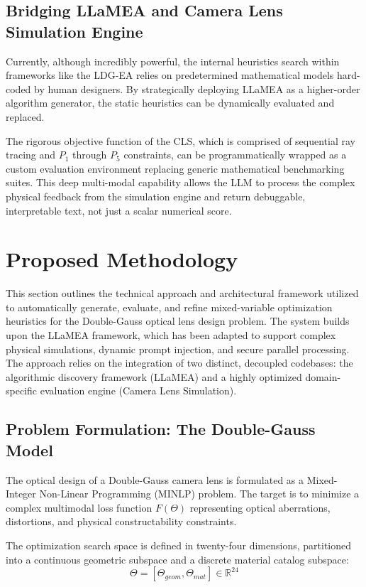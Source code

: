 \documentclass[12pt]{article}
\begin{document}
\subsection{Bridging LLaMEA and Camera Lens Simulation Engine}
Currently, although incredibly powerful, the internal heuristics search within frameworks like the LDG-EA relies on predetermined mathematical models hard-coded by human designers. By strategically deploying LLaMEA as a higher-order algorithm generator, the static heuristics can be dynamically evaluated and replaced.

The rigorous objective function of the CLS, which is comprised of sequential ray tracing and $P_1$ through $P_5$ constraints, can be programmatically wrapped as a custom evaluation environment replacing generic mathematical benchmarking suites. This deep multi-modal capability allows the LLM to process the complex physical feedback from the simulation engine and return debuggable, interpretable text, not just a scalar numerical score.


\section{Proposed Methodology}\label{sec:methodology}

This section outlines the technical approach and architectural framework utilized to automatically generate, evaluate, and refine mixed-variable optimization heuristics for the Double-Gauss optical lens design problem. The system builds upon the LLaMEA framework, which has been adapted to support complex physical simulations, dynamic prompt injection, and secure parallel processing. The approach relies on the integration of two distinct, decoupled codebases: the algorithmic discovery framework (LLaMEA) and a highly optimized domain-specific evaluation engine (Camera Lens Simulation).

\subsection{Problem Formulation: The Double-Gauss Model}
The optical design of a Double-Gauss camera lens is formulated as a Mixed-Integer Non-Linear Programming (MINLP) problem. The target is to minimize a complex multimodal loss function $F(\Theta)$ representing optical aberrations, distortions, and physical constructability constraints.

The optimization search space is defined in twenty-four dimensions, partitioned into a continuous geometric subspace and a discrete material catalog subspace:
\[ \Theta = [\Theta_{geom}, \Theta_{mat}] \in \mathbb{R}^{24} \]
\end{document}
